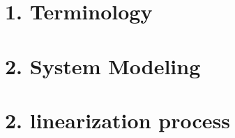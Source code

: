 \documentclass{cheatsheet}
\author{AUTHOR \\ \vspace*{-0.2em}}
\begin{document}
\section{1. Terminology}
	
	
	
	
	
	
	
	

\section{2. System Modeling}
	
	

\section{2. linearization process}
	
\end{document}
